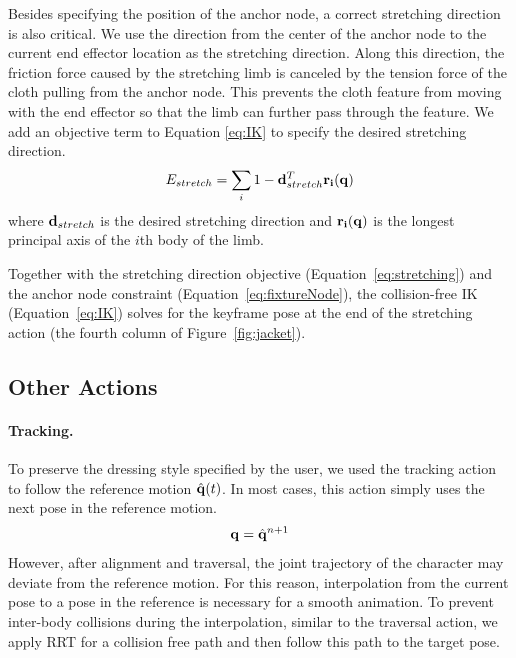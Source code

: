 Besides specifying the position of the anchor node, a correct stretching direction is also critical. We use the direction from the center of the anchor node to the current end effector location as the stretching direction. Along this direction, the friction force caused by the stretching limb is canceled by the tension force of the cloth pulling from the anchor node. This prevents the cloth feature from moving with the end effector so that the limb can further pass through the feature. We add an objective term to Equation \ref{eq:IK} to specify the desired stretching direction.
\begin{equation}
  E_{stretch} = \sum_i1 - \mathbf{d}_{stretch}^T\mathbf{r_i(q)}
  \label{eq:stretching}
\end{equation}
where $\mathbf{d}_{stretch}$ is the desired stretching direction and $\mathbf{r_i(q)}$ is the longest principal axis of the $i$th body of the limb. 

Together with the stretching direction objective (Equation~\ref{eq:stretching}) and the anchor node constraint (Equation~\ref{eq:fixtureNode}), the collision-free IK (Equation~\ref{eq:IK}) solves for the keyframe pose at the end of the stretching action (the fourth column of Figure~\ref{fig:jacket}).

\subsection{Other Actions}

\paragraph{Tracking.} To preserve the dressing style specified by the user, we used the tracking action to follow the reference motion $\hat{\mathbf{q}}(t)$. In most cases, this action simply uses the next pose in the reference motion.
\begin{displaymath}
\mathbf{q} = \hat{\mathbf{q}}^{n+1}
\end{displaymath}
However, after alignment and traversal, the joint trajectory of the character may deviate from the reference motion. For this reason, interpolation from the current pose to a pose in the reference is necessary for a smooth animation. To prevent inter-body collisions during the interpolation, similar to the traversal action, we apply RRT for a collision free path and then follow this path to the target pose.


